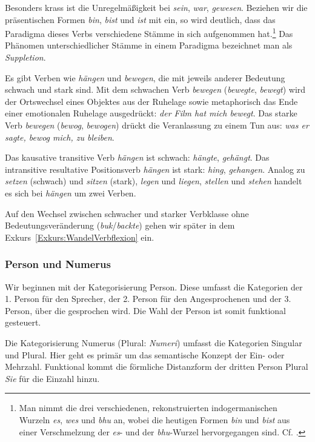 Besonders krass ist die Unregelmäßigkeit bei \textit{sein}, \textit{war}, \textit{gewesen}. Beziehen wir die präsentischen Formen \textit{bin}, \textit{bist} und \textit{ist} mit ein, so wird deutlich, dass das Paradigma dieses Verbs verschiedene Stämme in sich aufgenommen hat.\footnote{Man nimmt die drei verschiedenen, rekonstruierten indogermanischen Wurzeln \textit{es}, \textit{wes} und \textit{bhu} an, wobei die heutigen Formen \textit{bin} und \textit{bist} aus einer Verschmelzung der \textit{es}- und der \textit{bhu}-Wurzel hervorgegangen sind. Cf. \citet[206]{Nuebling2000}.} Das Phänomen unterschiedlicher Stämme in einem Paradigma bezeichnet man als \textit{Suppletion}.

Es gibt Verben wie \textit{hängen} und \textit{bewegen}, die mit jeweils anderer Bedeutung schwach und stark sind. Mit dem schwachen Verb \textit{bewegen} (\textit{bewegte}, \textit{bewegt}) wird der Ortswechsel eines Objektes aus der Ruhelage sowie metaphorisch das Ende einer emotionalen Ruhelage ausgedrückt: \textit{der Film hat mich bewegt}. Das starke Verb \textit{bewegen} (\textit{bewog}, \textit{bewogen}) drückt die Veranlassung zu einem Tun aus: \textit{was er sagte, bewog mich, zu bleiben}.   

Das kausative transitive Verb \textit{hängen} ist schwach: \textit{hängte}, \textit{gehängt}. Das intransitive resultative Positionsverb \textit{hängen} ist stark: \textit{hing}, \textit{gehangen}. Analog zu \textit{setzen} (schwach) und \textit{sitzen} (stark), \textit{legen} und \textit{liegen}, \textit{stellen} und \textit{stehen} handelt es sich bei \textit{hängen} um zwei Verben.


Auf den Wechsel zwischen schwacher und starker Verbklasse ohne Bedeutungsveränderung (\textit{buk}/\textit{backte}) gehen wir später in dem Exkurs~\ref{Exkurs:WandelVerbflexion} ein. 

\subsubsection{Person und Numerus}\label{subsubsection:Pers_Num}

Wir beginnen mit der Kategorisierung Person. Diese umfasst die Kategorien der 1. Person für den Sprecher, der 2. Person für den Angesprochenen und der 3. Person, über die gesprochen wird. Die Wahl der Person ist somit funktional gesteuert.

Die Kategorisierung Numerus (Plural: \textit{Numeri}) umfasst die Kategorien Singular und Plural. Hier geht es primär um das semantische Konzept der Ein- oder Mehrzahl. Funktional kommt die förmliche Distanzform der dritten Person Plural \textit{Sie} für die Einzahl hinzu.

